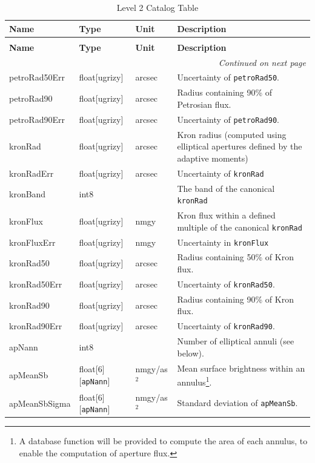 \documentclass[SE,lsstdraft,toc]{lsstdoc}
\newenvironment{schema}[3]{%
\setlength\LTleft{0pt}
\setlength\LTright{\fill}
\begin{longtable}{p{0.2\textwidth}p{0.14\textwidth}p{0.14\textwidth}p{0.41\textwidth}}

\caption[#1]{#2\label{#3}}\\

\hline \textbf{Name} & \textbf{Type} & \textbf{Unit} & \textbf{Description}\\ \hline
\endfirsthead

\caption[#1]{#2}\\

\hline \textbf{Name} & \textbf{Type} & \textbf{Unit} & \textbf{Description}\\ \hline
\endhead

\hline \multicolumn{4}{r}{\emph{Continued on next page}} \\
\endfoot

\hline\hline
\endlastfoot
}{%
\hline
\end{longtable}
}
\begin{document}
\begin{schema}{\Object Table}{Level 2 Catalog \Object Table}{tbl:objectTable}
petroRad50Err & float[ugrizy] & arcsec & Uncertainty of \texttt{petroRad50}. \\

petroRad90 & float[ugrizy] & arcsec & Radius containing 90\% of Petrosian flux. \\

petroRad90Err & float[ugrizy] & arcsec & Uncertainty of \texttt{petroRad90}. \\


kronRad & float[ugrizy] & arcsec & Kron radius (computed using elliptical apertures defined by the adaptive moments) \\

kronRadErr & float[ugrizy] & arcsec & Uncertainty of \texttt{kronRad} \\

kronBand & int8 & ~ & The band of the canonical \texttt{kronRad} \\

kronFlux & float[ugrizy] & nmgy & Kron flux within a defined multiple of the canonical \texttt{kronRad} \\

kronFluxErr & float[ugrizy] & nmgy & Uncertainty in \texttt{kronFlux} \\

kronRad50 & float[ugrizy] & arcsec & Radius containing 50\% of Kron flux. \\

kronRad50Err & float[ugrizy] & arcsec & Uncertainty of \texttt{kronRad50}. \\

kronRad90 & float[ugrizy] & arcsec & Radius containing 90\% of Kron flux. \\

kronRad90Err & float[ugrizy] & arcsec & Uncertainty of \texttt{kronRad90}. \\


apNann & int8 & ~ & Number of elliptical annuli (see below). \\

apMeanSb & float[6][\texttt{apNann}] & nmgy/as$^2$ & Mean surface brightness within an annulus\footnote{A database function will be provided to compute the area of each annulus, to enable the computation of aperture flux.}. \\

apMeanSbSigma & float[6][\texttt{apNann}] & nmgy/as$^2$ & Standard deviation of \texttt{apMeanSb}. \\


\end{schema}
\end{document}
